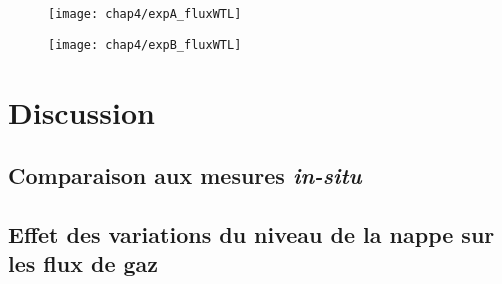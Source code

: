 \begin{figure}
\centering
\begin{minipage}{.5\textwidth}
  \centering
  \texttt{[image: chap4/expA\_fluxWTL]}
  \label{fig:test1}
\end{minipage}%
\begin{minipage}{.5\textwidth}
  \centering
  \texttt{[image: chap4/expB\_fluxWTL]}
  \label{fig:test2}
\end{minipage}
\end{figure}


\section{Discussion}

\subsection{Comparaison aux mesures \textit{in-situ}}

\subsection{Effet des variations du niveau de la nappe sur les flux de gaz}

